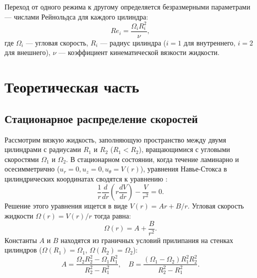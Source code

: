\documentclass[a4paper,12pt]{article}
\begin{document}
Переход от одного режима к другому определяется безразмерными параметрами — числами Рейнольдса для каждого цилиндра:
\[
Re_i = \frac{\Omega_i R_i^2}{\nu},
\]
где \(\Omega_i\) — угловая скорость, \(R_i\) — радиус цилиндра (\(i=1\) для внутреннего, \(i=2\) для внешнего), \(\nu\) — коэффициент кинематической вязкости жидкости.

\section{Теоретическая часть}

\subsection{Стационарное распределение скоростей}
Рассмотрим вязкую жидкость, заполняющую пространство между двумя цилиндрами с радиусами \(R_1\) и \(R_2\) (\(R_1 < R_2\)), вращающимися с угловыми скоростями \(\Omega_1\) и \(\Omega_2\). В стационарном состоянии, когда течение ламинарно и осесимметрично (\(u_r = 0, u_z = 0, u_\theta = V(r)\)), уравнения Навье-Стокса в цилиндрических координатах сводятся к уравнению :
\begin{equation}
\frac{1}{r} \frac{d}{dr}\left(r \frac{dV}{dr}\right) - \frac{V}{r^2} = 0.
\label{eq:stationary}
\end{equation}
Решение этого уравнения ищется в виде \(V(r) = Ar + B/r\). Угловая скорость жидкости \(\Omega(r) = V(r)/r\) тогда равна:
\begin{equation}
\Omega(r) = A + \frac{B}{r^2}.
\label{eq:omega}
\end{equation}
Константы \(A\) и \(B\) находятся из граничных условий прилипания на стенках цилиндров (\(\Omega(R_1) = \Omega_1\), \(\Omega(R_2) = \Omega_2\)):
\begin{equation}
A = \frac{\Omega_2 R_2^2 - \Omega_1 R_1^2}{R_2^2 - R_1^2}, \quad B = \frac{(\Omega_1 - \Omega_2) R_1^2 R_2^2}{R_2^2 - R_1^2}.
\label{eq:AB}
\end{equation}
\end{document}
